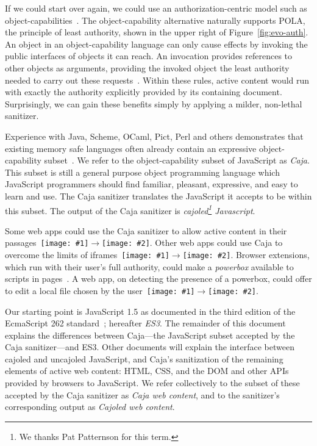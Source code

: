 \documentclass[letterpaper,twocolumn,10pt]{article}
\newcommand{\qq}[2]{{\texttt{[image: \#1]}}$\rightarrow${\texttt{[image: \#2]}}}
\begin{document}
If we could start over again, we could use an authorization-centric model 
such as object-capabilities~\cite{DVH}. The object-capability alternative 
naturally supports POLA, the principle of least authority, shown in the upper 
right of Figure~\ref{fig:evo-auth}. An object in an object-capability 
language can only cause effects by invoking the public interfaces of objects 
it can reach. An invocation provides references to other objects as 
arguments, providing the invoked object the least authority needed to carry 
out these requests~\cite{RobustComposition}. Within these rules, active 
content would run with exactly the authority explicitly provided by its 
containing document. Surprisingly, we can gain these benefits simply by 
applying a milder, non-lethal sanitizer.

Experience with Java, Scheme, OCaml, Pict, Perl and others demonstrates that 
existing memory safe languages often already contain an expressive 
object-capability subset~\cite[respectively]{joe-e, rees96security, emily, 
backwater, caperl}. We refer to the object-capability subset of JavaScript as 
\emph{Caja}. This subset is still a general purpose object programming 
language which JavaScript programmers should find familiar, pleasant, 
expressive, and easy to learn and use. The Caja sanitizer translates the 
JavaScript it accepts to be within this subset. The output of the Caja 
sanitizer is \emph{cajoled\footnote{
%
We thanks Pat Patternson for this term.
%
} Javascript}.

Some web apps could use the Caja sanitizer to allow active content in their 
passages~\qq{1}{5}. Other web apps could use Caja to overcome the limits of 
iframes~\qq{3}{5}. Browser extensions, which run with their user's full 
authority, could make a \emph{powerbox} available to scripts in 
pages~\cite{darpareview, stiegler:polaris, seaborn:plash, bitfrost}. A web 
app, on detecting the presence of a powerbox, could offer to edit a local 
file chosen by the user~\qq{4}{6}.

Our starting point is JavaScript 1.5 as documented in the third edition of 
the EcmaScript 262 standard~\cite{ECMA-262}; hereafter \emph{ES3}. The 
remainder of this document explains the differences between Caja---the 
JavaScript subset accepted by the Caja sanitizer---and ES3. Other documents 
will explain the interface between cajoled and uncajoled JavaScript, and 
Caja's sanitization of the remaining elements of active web content: HTML, 
CSS, and the DOM and other APIs provided by browsers to JavaScript. We refer 
collectively to the subset of these accepted by the Caja sanitizer as 
\emph{Caja web content}, and to the sanitizer's corresponding output as 
\emph{Cajoled web content}.
\end{document}
